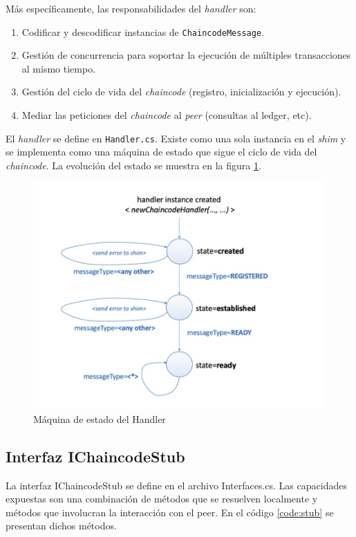 Más específicamente, las responsabilidades del \textit{handler} son:

\begin{enumerate}
\item Codificar y descodificar instancias de \texttt{ChaincodeMessage}.
\item Gestión de concurrencia para soportar la ejecución de múltiples transacciones al mismo tiempo.
\item Gestión del ciclo de vida del \textit{chaincode} (registro, inicialización y ejecución).
\item Mediar las peticiones del \textit{chaincode} al \textit{peer} (consultas al ledger, etc).
\end{enumerate}

El \textit{handler} se define en \texttt{Handler.cs}. Existe como una sola instancia en el \textit{shim} y se implementa como una máquina de estado que sigue el ciclo de vida del \textit{chaincode}. La evolución del estado se muestra en la figura \ref{fig:handlerstate}.

\begin{figure}[tbph]
\centering
\includegraphics[width=12cm]{Images/handler_state_machine}
\caption{Máquina de estado del Handler}
\label{fig:handlerstate}
\end{figure}


\subsection{Interfaz IChaincodeStub}
La interfaz IChaincodeStub se define en el archivo Interfaces.cs. Las capacidades expuestas son una combinación de métodos que se resuelven localmente y métodos que involucran la interacción con el peer. En el código \ref{code:stub} se presentan dichos métodos.\\

